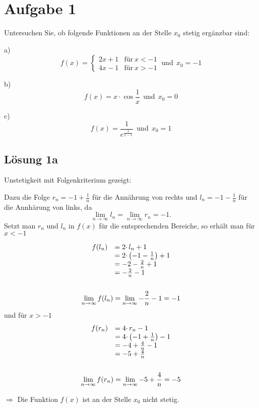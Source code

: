 \documentclass[main.tex]{subfiles}
\begin{document}
\section{Aufgabe 1}
Untersuchen Sie, ob folgende Funktionen an der Stelle $x_{0}$ stetig ergänzbar sind:

a)
\begin{equation*}
    f(x) =\begin{cases}
        2x+1 & \text{für} \ x < -1\\
        4x-1 & \text{für} \ x > -1
    \end{cases} \ \text{und} \ \ x_{0} = -1
\end{equation*}

b)
\begin{equation*}
    f(x) =x\cdotp \cos\frac{1}{x} \ \ \text{und} \ \ x_{0} = 0
\end{equation*}

c)
\begin{equation*}
    f(x) =\frac{1}{e^{\frac{1}{x-1}}} \ \ \text{und} \ \ x_{0} = 1
\end{equation*}

\subsection{Lösung 1a}

Unstetigkeit mit Folgenkriterium gezeigt:

Dazu die Folge $r_{n} =-1+\frac{1}{n}$ für die Annährung von rechts und $l_{n} =-1-\frac{1}{n}$ für die Annhärung von links, da
\begin{equation*}
    \lim _{n\rightarrow \infty } l_{n} =\lim _{n\rightarrow \infty } r_{n} =-1\text{.}
\end{equation*}
Setzt man $r_{n}$ und $l_{n}$ in $f( x)$ für die entsprechenden Bereiche, so erhält man für $x< -1$


\begin{gather*}
    \begin{array}{ c l }
        f( l_{n}) & =2\cdotp l_{n} +1\\
        & =2\cdotp \left( -1-\frac{1}{n}\right) +1\\
        & =-2-\frac{2}{n} +1\\
        & =-\frac{2}{n} -1
    \end{array}\\
    \\
    \lim _{n\rightarrow \infty } f( l_{n}) =\lim _{n\rightarrow \infty } -\frac{2}{n} -1=-1
\end{gather*}
und für $x >-1$
\begin{gather*}
    \begin{array}{ c l }
        f( r_{n}) & =4\cdotp r_{n} -1\\
        & =4\cdotp \left( -1+\frac{1}{n}\right) -1\\
        & =-4+\frac{4}{n} -1\\
        & =-5+\frac{4}{n}
    \end{array}\\
    \\
    \lim _{n\rightarrow \infty } f( r_{n}) =\lim _{n\rightarrow \infty } -5+\frac{4}{n} =-5
\end{gather*}


$\Rightarrow$ Die Funktion $f(x)$ ist an der Stelle $x_{0}$ nicht stetig.
\end{document}
